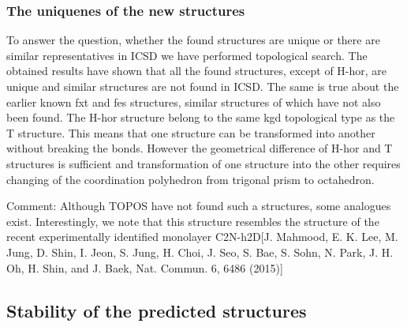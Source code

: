 \documentclass[a4paperm]{article}
\begin{document}
\subsubsection{The uniquenes of the new structures}

To answer the question, whether the found structures are unique or there are similar representatives in ICSD we have performed topological search.
The obtained results have shown that all the found structures, except of H-hor, are unique and similar structures are not found in ICSD.
The same is true about the earlier known fxt and fes structures, similar structures of which have not also been found. 
The H-hor structure belong to the same kgd topological type as the T structure.
This means that one structure can be transformed into another without breaking the bonds.
However the geometrical difference of H-hor and T structures is sufficient and transformation of one structure into the other requires changing of the coordination polyhedron from trigonal prism to octahedron.

Comment:
Although TOPOS have not found such a structures, some analogues exist.
Interestingly, we note that this structure resembles the structure of the recent experimentally identified monolayer C2N-h2D[J. Mahmood, E. K. Lee, M. Jung, D. Shin, I. Jeon, S. Jung, H. Choi, J. Seo, S. Bae, S. Sohn, N. Park, J. H. Oh, H. Shin, and J.
Baek, Nat. Commun. 6, 6486 (2015)]

\subsection{Stability of the predicted structures}

\end{document}
